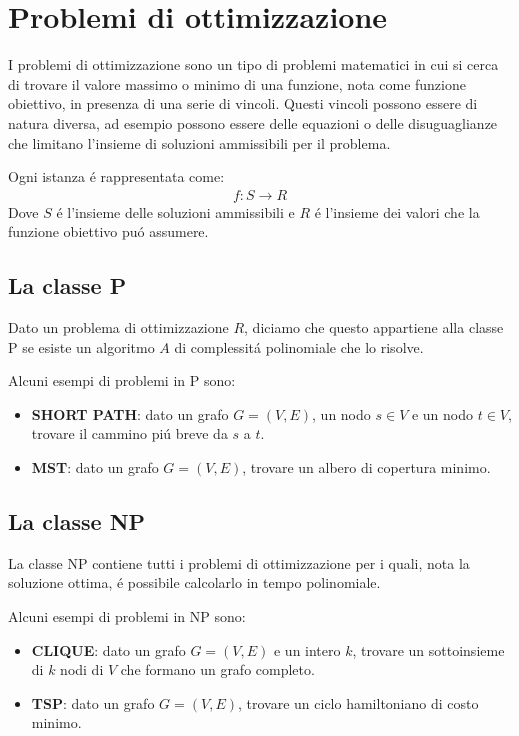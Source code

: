 \chapter{Problemi di ottimizzazione}
I problemi di ottimizzazione sono un tipo di problemi matematici in cui si cerca di trovare il valore massimo o minimo di una funzione, nota come funzione obiettivo, in presenza di una serie di vincoli. Questi vincoli possono essere di natura diversa, ad esempio possono essere delle equazioni o delle disuguaglianze che limitano l'insieme di soluzioni ammissibili per il problema.

Ogni istanza \'e rappresentata come:
\begin{eqnarray}
  f: S \rightarrow R
\end{eqnarray}
Dove $S$ \'e l'insieme delle soluzioni ammissibili e $R$ \'e l'insieme dei valori che la funzione obiettivo pu\'o assumere.


\section{La classe P}

Dato un problema di ottimizzazione $R$, diciamo che questo appartiene
alla classe P se esiste un algoritmo $A$ di complessit\'a polinomiale che
lo risolve.

Alcuni esempi di problemi in P sono:
\begin{itemize}
  \item \textbf{SHORT PATH}: dato un grafo $G = (V, E)$, un nodo $s \in V$ e un nodo $t \in V$, trovare il cammino pi\'u breve da $s$ a $t$.
  \item \textbf{MST}: dato un grafo $G = (V, E)$, trovare un albero di copertura minimo. 
\end{itemize}


\section{La classe NP}

La classe NP contiene tutti i problemi di ottimizzazione per i quali, 
nota la soluzione ottima, \'e possibile calcolarlo in tempo polinomiale.

Alcuni esempi di problemi in NP sono:
\begin{itemize}
  \item \textbf{CLIQUE}: dato un grafo $G = (V, E)$ e un intero $k$, trovare un sottoinsieme di $k$ nodi di $V$ che formano un grafo completo.
  \item \textbf{TSP}: dato un grafo $G = (V, E)$, trovare un ciclo hamiltoniano di costo minimo.
\end{itemize}



